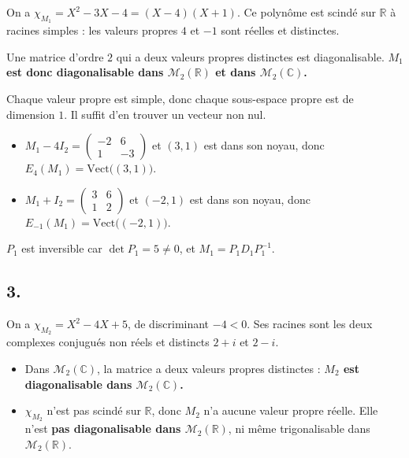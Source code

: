 \documentclass[11pt,a4paper]{article}
\providecommand{\tightlist}{\setlength{\itemsep}{0pt}\setlength{\parskip}{0pt}}
\newcommand{\equationajustee}[1]{%
  \sbox{\boiteequation}{$\displaystyle #1$}%
  \ifdim\wd\boiteequation>\linewidth
    \[\resizebox{\linewidth}{!}{\usebox{\boiteequation}}\]%
  \else
    \[#1\]%
  \fi}
\begin{document}
On a \(\chi_{M_1}=X^2-3X-4=(X-4)(X+1)\). Ce polynôme est scindé sur \(\mathbb{R}\) à racines simples : les valeurs propres \(4\) et \(-1\) sont réelles et distinctes.

Une matrice d'ordre \(2\) qui a deux valeurs propres distinctes est diagonalisable. \textbf{\(M_1\) est donc diagonalisable dans \({\mathcal{M}}_2(\mathbb{R})\) et dans \({\mathcal{M}}_2(\mathbb{C})\).}

Chaque valeur propre est simple, donc chaque sous-espace propre est de dimension \(1\). Il suffit d'en trouver un vecteur non nul.

\begin{itemize}
\tightlist
\item
  \(M_1-4I_2=\begin{pmatrix}-2&6\\1&-3\end{pmatrix}\) et \((3,1)\) est dans son noyau, donc \(E_4(M_1)=\mathrm{Vect}\big((3,1)\big)\).
\item
  \(M_1+I_2=\begin{pmatrix}3&6\\1&2\end{pmatrix}\) et \((-2,1)\) est dans son noyau, donc \(E_{-1}(M_1)=\mathrm{Vect}\big((-2,1)\big)\).
\end{itemize}

\equationajustee{\boxed{P_1=\begin{pmatrix}3&-2\\1&1\end{pmatrix},\qquad D_1=\begin{pmatrix}4&0\\0&-1\end{pmatrix}}}

\(P_1\) est inversible car \(\det P_1=5\neq0\), et \(M_1=P_1D_1P_1^{-1}\).

\hypertarget{section-2}{%
\subsection{3.}\label{section-2}}

On a \(\chi_{M_2}=X^2-4X+5\), de discriminant \(-4<0\). Ses racines sont les deux complexes conjugués non réels et distincts \(2+i\) et \(2-i\).

\begin{itemize}
\tightlist
\item
  Dans \({\mathcal{M}}_2(\mathbb{C})\), la matrice a deux valeurs propres distinctes : \textbf{\(M_2\) est diagonalisable dans \({\mathcal{M}}_2(\mathbb{C})\).}
\item
  \(\chi_{M_2}\) n'est pas scindé sur \(\mathbb{R}\), donc \(M_2\) n'a aucune valeur propre réelle. Elle n'est \textbf{pas diagonalisable dans \({\mathcal{M}}_2(\mathbb{R})\)}, ni même trigonalisable dans \({\mathcal{M}}_2(\mathbb{R})\).
\end{itemize}
\end{document}
